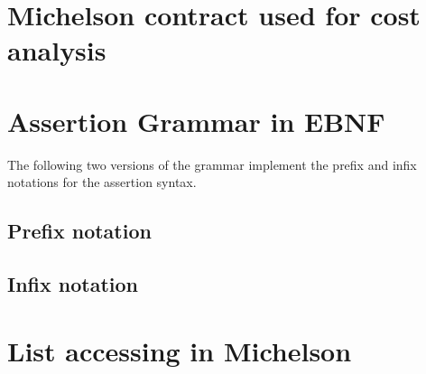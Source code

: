 \appendix
\chapter{Michelson contract used for cost analysis}

\chapter{Assertion Grammar in EBNF}\label{apx:grammar}
The following two versions of the grammar implement the prefix and infix notations for the assertion syntax. 

\section{Prefix notation}


\section{Infix notation}


\chapter{List accessing in Michelson}\label{apx:nth}


				 
